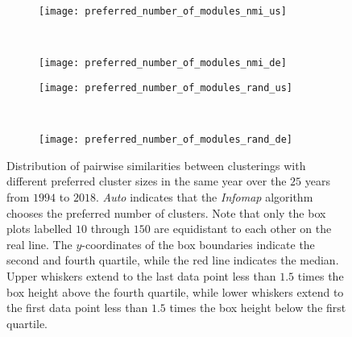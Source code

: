 \begin{figure}[H]
	\centering
	\begin{subfigure}{0.5\linewidth}
		\texttt{[image: preferred\_number\_of\_modules\_nmi\_us]}
	\end{subfigure}~%
	\begin{subfigure}{0.5\linewidth}
		\texttt{[image: preferred\_number\_of\_modules\_nmi\_de]}
	\end{subfigure}
	\begin{subfigure}{0.5\linewidth}
		\texttt{[image: preferred\_number\_of\_modules\_rand\_us]}
	\end{subfigure}~%
	\begin{subfigure}{0.5\linewidth}
		\texttt{[image: preferred\_number\_of\_modules\_rand\_de]}
	\end{subfigure}
	\caption{Distribution of pairwise similarities between clusterings with different preferred cluster sizes in the same year over the $25$ years from $1994$ to $2018$. 
		\emph{Auto} indicates that the \emph{Infomap} algorithm chooses the preferred number of clusters.
		Note that only the box plots labelled $10$ through $150$ are equidistant to each other on the real line. 
		The $y$-coordinates of the box boundaries indicate the second and fourth quartile, while the red line indicates the median. 
		Upper whiskers extend to the last data point less than $1.5$ times the box height above the fourth quartile, 
		while lower whiskers extend to the first data point less than $1.5$ times the box height below the first quartile.
	}\label{fig:sensitivity-preferred-clusters}
\end{figure}

\newpage

